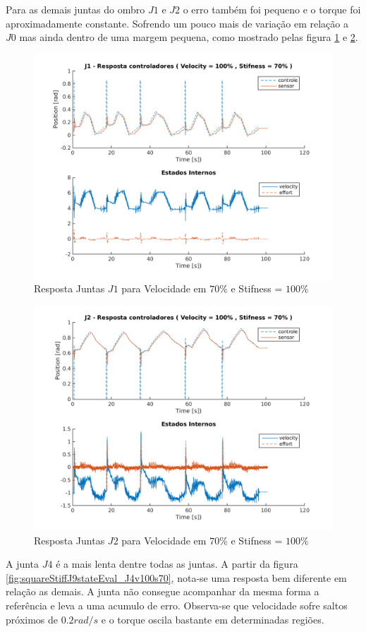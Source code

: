 Para as demais juntas do ombro $J1$ e $J2$ o erro também foi pequeno e o torque foi aproximadamente constante. Sofrendo um pouco mais de variação em relação a $J0$ mas ainda dentro de uma margem pequena, como mostrado pelas figura \ref{fig:squareStiffJ9stateEval_J1v100s70} e \ref{fig:squareStiffJ9stateEval_J2v100s70}.

\vspace{1cm}
\begin{figure}[H]
    \centering
    \includegraphics[width=0.6\linewidth,trim={2cm 1cm 2cm 2cm}]{tex/figs/squareStiffJ9stateEval_J1v100s70.png}
    \caption{Resposta Juntas $J1$ para Velocidade em $70\%$ e Stifness = $100\%$ }
    \label{fig:squareStiffJ9stateEval_J1v100s70}
\end{figure}

\vspace{1cm}

\begin{figure}[H]
    \centering
    \includegraphics[width=0.6\linewidth,trim={2cm 1cm 2cm 2cm}]{tex/figs/squareStiffJ9stateEval_J2v100s70.png}
    \caption{Resposta Juntas $J2$ para Velocidade em $70\%$ e Stifness = $100\%$ }
    \label{fig:squareStiffJ9stateEval_J2v100s70}
\end{figure}

A junta $J4$ é a mais lenta dentre todas as juntas. A partir da figura \ref{fig:squareStiffJ9stateEval_J4v100s70}, nota-se uma resposta bem diferente em relação as demais. A junta não consegue acompanhar da mesma forma a referência e leva a uma acumulo de erro. Observa-se que velocidade sofre saltos próximos de $0.2 rad/s$ e o torque oscila bastante em determinadas regiões.

